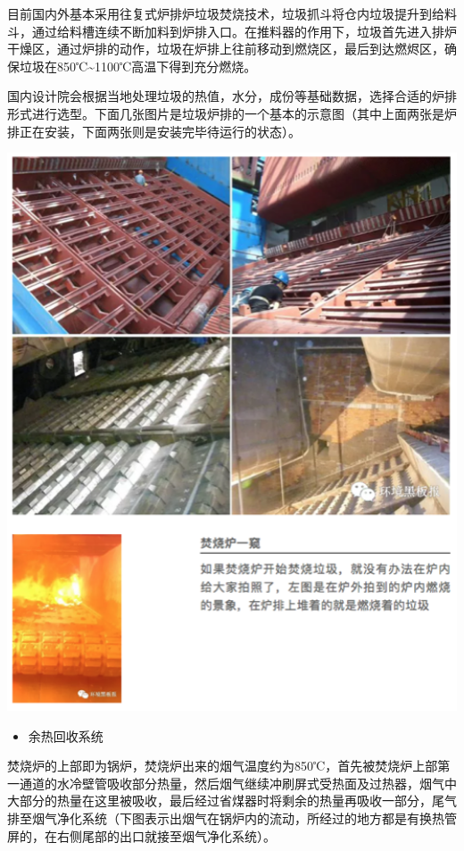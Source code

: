 \documentclass[]{book}
\providecommand{\tightlist}{%
  \setlength{\itemsep}{0pt}\setlength{\parskip}{0pt}}
\begin{document}
目前国内外基本采用往复式炉排炉垃圾焚烧技术，垃圾抓斗将仓内垃圾提升到给料斗，通过给料槽连续不断加料到炉排入口。在推料器的作用下，垃圾首先进入排炉干燥区，通过炉排的动作，垃圾在炉排上往前移动到燃烧区，最后到达燃烬区，确保垃圾在850℃\textasciitilde{}1100℃高温下得到充分燃烧。

国内设计院会根据当地处理垃圾的热值，水分，成份等基础数据，选择合适的炉排形式进行选型。下面几张图片是垃圾炉排的一个基本的示意图（其中上面两张是炉排正在安装，下面两张则是安装完毕待运行的状态）。

\includegraphics[width=6.72in]{images/ljfs4}

\begin{itemize}
\tightlist
\item
  余热回收系统
\end{itemize}

焚烧炉的上部即为锅炉，焚烧炉出来的烟气温度约为850℃，首先被焚烧炉上部第一通道的水冷壁管吸收部分热量，然后烟气继续冲刷屏式受热面及过热器，烟气中大部分的热量在这里被吸收，最后经过省煤器时将剩余的热量再吸收一部分，尾气排至烟气净化系统（下图表示出烟气在锅炉内的流动，所经过的地方都是有换热管屏的，在右侧尾部的出口就接至烟气净化系统）。
\end{document}
